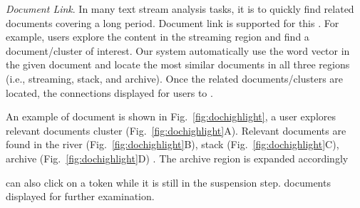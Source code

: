 \emph{\normalsize Document Link}.
In many text stream analysis tasks, it is  to quickly find related documents covering a long  period.
Document link is supported for this .
For example, users  explore the content in the streaming region and find a document/cluster of interest.
Our system  automatically use the word vector in the given document and locate the most similar documents in all three regions (i.e., streaming, stack, and archive).
Once the related documents/clusters are located, the connections  displayed for users to .

An example of document  is shown in Fig.~\ref{fig:dochighlight},
 a user explores relevant documents  cluster (Fig.~\ref{fig:dochighlight}A).
Relevant documents are found in the river (Fig.~\ref{fig:dochighlight}B), stack (Fig.~\ref{fig:dochighlight}C),  archive (Fig.~\ref{fig:dochighlight}D) .
The archive region is expanded accordingly 

 can also click on a token while it is still in the suspension step.
 documents   displayed for further examination.


